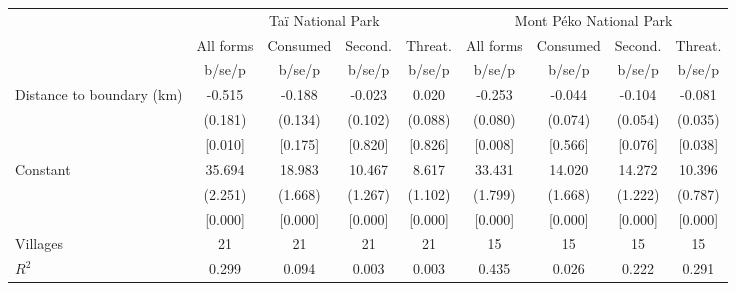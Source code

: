 \begin{tabular}{l*{8}{c}}
\toprule
            &\multicolumn{4}{c}{Taï National Park}              &\multicolumn{4}{c}{Mont Péko National Park}        \\\cmidrule(lr){2-5}\cmidrule(lr){6-9}
            &\multicolumn{1}{c}{All forms}&\multicolumn{1}{c}{Consumed}&\multicolumn{1}{c}{Second.}&\multicolumn{1}{c}{Threat.}&\multicolumn{1}{c}{All forms}&\multicolumn{1}{c}{Consumed}&\multicolumn{1}{c}{Second.}&\multicolumn{1}{c}{Threat.}\\
            &      b/se/p&      b/se/p&      b/se/p&      b/se/p&      b/se/p&      b/se/p&      b/se/p&      b/se/p\\
\midrule
Distance to boundary (km)&      -0.515&      -0.188&      -0.023&       0.020&      -0.253&      -0.044&      -0.104&      -0.081\\
            &     (0.181)&     (0.134)&     (0.102)&     (0.088)&     (0.080)&     (0.074)&     (0.054)&     (0.035)\\
            &     [0.010]&     [0.175]&     [0.820]&     [0.826]&     [0.008]&     [0.566]&     [0.076]&     [0.038]\\
Constant    &      35.694&      18.983&      10.467&       8.617&      33.431&      14.020&      14.272&      10.396\\
            &     (2.251)&     (1.668)&     (1.267)&     (1.102)&     (1.799)&     (1.668)&     (1.222)&     (0.787)\\
            &     [0.000]&     [0.000]&     [0.000]&     [0.000]&     [0.000]&     [0.000]&     [0.000]&     [0.000]\\
\midrule
Villages    &          21&          21&          21&          21&          15&          15&          15&          15\\
$R^2$       &       0.299&       0.094&       0.003&       0.003&       0.435&       0.026&       0.222&       0.291\\
\bottomrule
\end{tabular}
